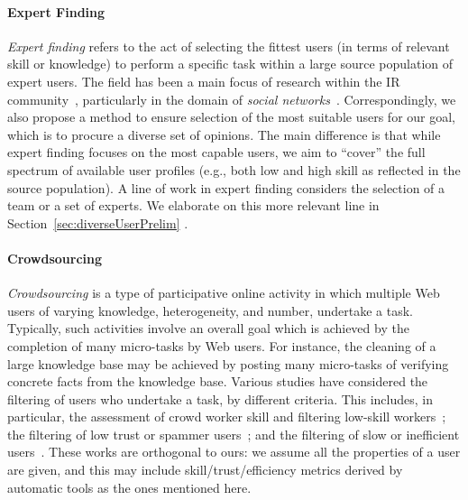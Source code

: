\paragraph*{Expert Finding}
\emph{Expert finding} refers to the act of selecting the fittest users (in terms of relevant skill or knowledge) to perform a  specific task within a large source population of expert users. The field has been a main focus of research within the IR community~\cite{tang2011expertisehetro,campbell2003expertemail}, particularly in the domain of \emph{social networks}~\cite{zhang2007expertsoc,bozzon2013choosing}. Correspondingly, we also propose a method to ensure selection of the most suitable users for our goal, which is to procure a diverse set of opinions. The main difference is that while expert finding focuses on the most capable users, we aim to ``cover'' the full spectrum of available user profiles (e.g., both low and high skill as reflected in the source population). A line of work in expert finding considers the selection of a team or a set of experts. We elaborate on this more relevant line in Section~\ref{sec:diverseUserPrelim} .

\paragraph*{Crowdsourcing}
\emph{Crowdsourcing} is a type of participative online activity in which multiple Web users of varying knowledge, heterogeneity, and number, undertake a task. Typically, such activities involve an overall goal which is achieved by the completion of many micro-tasks by Web users. For instance, the cleaning of a large knowledge base may be achieved by posting many micro-tasks of verifying concrete facts from the knowledge base.  %
Various studies have considered the filtering of users who undertake a task, by different criteria. This includes, in particular, the assessment of crowd worker skill and filtering low-skill workers~\cite{ipeirotis2010quality}; the filtering of low trust or spammer users~\cite{raykar2012spam}; and the filtering of slow or inefficient users~\cite{haas2015CLAMShell}. These works are orthogonal to ours: we assume all the properties of a user are given, and this may include skill/trust/efficiency metrics derived by automatic tools as the ones mentioned here. 

